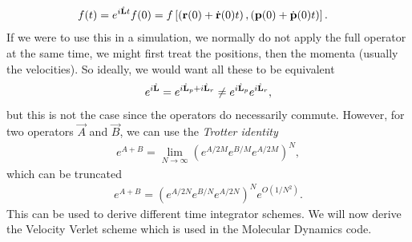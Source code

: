 \begin{align}
	f(t) &= e^{i\hat{\mathbf L} t}f(0) = f\left[\left(\mathbf r(0) + \dot{\mathbf r}(0)t\right), \left(\mathbf p(0) + \dot{\mathbf p}(0)t\right)\right].
\end{align}
If we were to use this in a simulation, we normally do not apply the full operator at the same time, we might first treat the positions, then the momenta (usually the velocities). So ideally, we would want all these to be equivalent
\begin{align}
	e^{i\hat{\mathbf L}} = e^{i\hat{\mathbf L}_p + i\hat{\mathbf L}_r} \neq e^{i\hat{\mathbf L}_p}e^{i\hat{\mathbf L}_r},
\end{align}
but this is not the case since the operators do necessarily commute. However, for two operators $\vec A$ and $\vec B$, we can use the \textit{Trotter identity}\cite{frenkel2001understanding}
\begin{align}
	e^{A + B} = \lim_{N\rightarrow\infty}\left(e^{A/2M}e^{B/M}e^{A/2M}\right)^N,
\end{align}
which can be truncated
\begin{align}
	e^{A + B} = \left(e^{A/2N}e^{B/N}e^{A/2N}\right)^Ne^{O(1/N^2)}.
\end{align}
This can be used to derive different time integrator schemes. We will now derive the Velocity Verlet scheme which is used in the Molecular Dynamics code.
